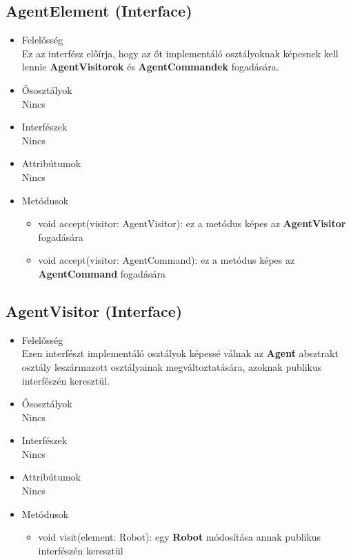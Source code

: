 \subsection{AgentElement (Interface)}
\begin{itemize}

\item Felelősség\\
Ez az interfész előírja, hogy az őt implementáló osztályoknak képesnek kell lennie \textbf{AgentVisitorok} és \textbf{AgentCommandek} fogadására. 

\item Ősosztályok\\
Nincs

\item Interfészek\\
Nincs

\item Attribútumok\\
Nincs

\item Metódusok\\

\begin{itemize}
    \item void accept(visitor: AgentVisitor): ez a metódus képes az \textbf{AgentVisitor} fogadására
    \item void accept(visitor: AgentCommand): ez a metódus képes az \textbf{AgentCommand} fogadására
\end{itemize}

\end{itemize}

\subsection{AgentVisitor (Interface)}
\begin{itemize}

\item Felelősség\\
Ezen interfészt implementáló osztályok képessé válnak az \textbf{Agent} absztrakt osztály leszármazott osztályainak megváltoztatására, azoknak publikus interfészén keresztül.

\item Ősosztályok\\
Nincs

\item Interfészek\\
Nincs

\item Attribútumok\\
Nincs

\item Metódusok\\

\begin{itemize}
    \item void visit(element: Robot): egy \textbf{Robot} módosítása annak publikus interfészén keresztül
\end{itemize}

\end{itemize}

